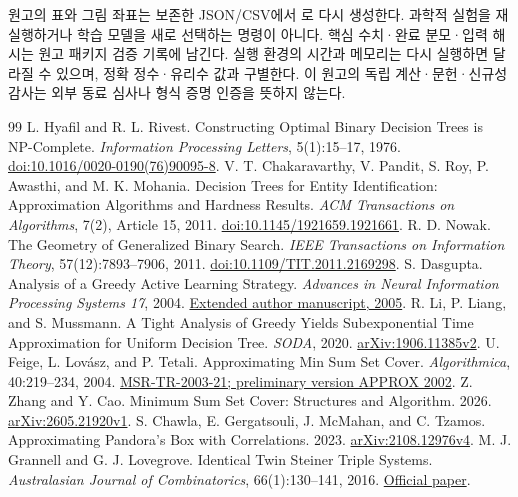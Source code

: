 \documentclass[11pt,a4paper]{article}
\theoremstyle{definition}
\theoremstyle{remark}\newtheorem{remark}[theorem]{주석}
\newcommand{\code}[1]{\texttt{\detokenize{#1}}}
\begin{document}
\noindent 원고의 표와 그림 좌표는 보존한 JSON/CSV에서 \code{paper_work/build_manuscript.py}로 다시 생성한다. 과학적 실험을 재실행하거나 학습 모델을 새로 선택하는 명령이 아니다. 핵심 수치·완료 분모·입력 해시는 원고 패키지 검증 기록에 남긴다. 실행 환경의 시간과 메모리는 다시 실행하면 달라질 수 있으며, 정확 정수·유리수 값과 구별한다. 이 원고의 독립 계산·문헌·신규성 감사는 외부 동료 심사나 형식 증명 인증을 뜻하지 않는다.

\FloatBarrier
\begin{thebibliography}{99}\fontsize{9}{10}\selectfont\setlength{\itemsep}{0pt}\setlength{\parsep}{0pt}\setlength{\parskip}{0pt}
 L. Hyafil and R. L. Rivest. Constructing Optimal Binary Decision Trees is NP-Complete. \emph{Information Processing Letters}, 5(1):15--17, 1976. \href{https://doi.org/10.1016/0020-0190(76)90095-8}{doi:10.1016/0020-0190(76)90095-8}.
 V. T. Chakaravarthy, V. Pandit, S. Roy, P. Awasthi, and M. K. Mohania. Decision Trees for Entity Identification: Approximation Algorithms and Hardness Results. \emph{ACM Transactions on Algorithms}, 7(2), Article 15, 2011. \href{https://doi.org/10.1145/1921659.1921661}{doi:10.1145/1921659.1921661}.
 R. D. Nowak. The Geometry of Generalized Binary Search. \emph{IEEE Transactions on Information Theory}, 57(12):7893--7906, 2011. \href{https://doi.org/10.1109/TIT.2011.2169298}{doi:10.1109/TIT.2011.2169298}.
 S. Dasgupta. Analysis of a Greedy Active Learning Strategy. \emph{Advances in Neural Information Processing Systems 17}, 2004. \href{https://cseweb.ucsd.edu/~dasgupta/papers/greedy.pdf}{Extended author manuscript, 2005}.
 R. Li, P. Liang, and S. Mussmann. A Tight Analysis of Greedy Yields Subexponential Time Approximation for Uniform Decision Tree. \emph{SODA}, 2020. \href{https://arxiv.org/abs/1906.11385v2}{arXiv:1906.11385v2}.
 U. Feige, L. Lovász, and P. Tetali. Approximating Min Sum Set Cover. \emph{Algorithmica}, 40:219--234, 2004. \href{https://www.microsoft.com/en-us/research/wp-content/uploads/2016/02/tr-2003-21.pdf}{MSR-TR-2003-21; preliminary version APPROX 2002}.
 Z. Zhang and Y. Cao. Minimum Sum Set Cover: Structures and Algorithm. 2026. \href{https://arxiv.org/abs/2605.21920v1}{arXiv:2605.21920v1}.
 S. Chawla, E. Gergatsouli, J. McMahan, and C. Tzamos. Approximating Pandora's Box with Correlations. 2023. \href{https://arxiv.org/abs/2108.12976v4}{arXiv:2108.12976v4}.
 M. J. Grannell and G. J. Lovegrove. Identical Twin Steiner Triple Systems. \emph{Australasian Journal of Combinatorics}, 66(1):130--141, 2016. \href{https://ajc.maths.uq.edu.au/pdf/66/ajc_v66_p130.pdf}{Official paper}.

\end{thebibliography}
\end{document}
